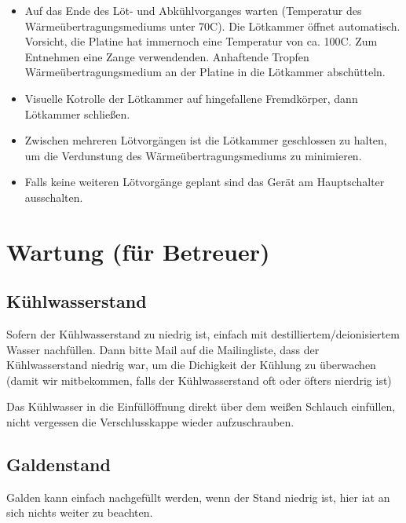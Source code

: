 \documentclass{\basedir/fablab-document}
\begin{document}
\begin{itemize}
	\item Auf das Ende des L{\"o}t- und Abk{\"u}hlvorganges warten (Temperatur des W{\"a}rme{\"u}bertragungsmediums unter 70\textdegree C). Die L{\"o}tkammer {\"o}ffnet automatisch. Vorsicht, die Platine hat immernoch eine Temperatur von ca. 100\textdegree C. Zum Entnehmen eine Zange verwendenden. Anhaftende Tropfen W{\"a}rme{\"u}bertragungsmedium an der Platine in die L{\"o}tkammer absch{\"u}tteln.
	\item Visuelle Kotrolle der L{\"o}tkammer auf hingefallene Fremdk{\"o}rper, dann L{\"o}tkammer schlie{\ss}en. 
	\item Zwischen mehreren L{\"o}tvorg{\"a}ngen ist die L{\"o}tkammer geschlossen zu halten, um die Verdunstung des W{\"a}rme{\"u}bertragungsmediums zu minimieren.
	\item Falls keine weiteren L{\"o}tvorg{\"a}nge geplant sind das Ger{\"a}t am Hauptschalter ausschalten. 
	
	\end{itemize}	
	
	\section{Wartung (f{\"u}r Betreuer)}
	
	\subsection{K{\"u}hlwasserstand}
	
	Sofern der K{\"u}hlwasserstand zu niedrig ist, einfach mit destilliertem/deionisiertem Wasser nachf{\"u}llen. Dann bitte Mail auf die Mailingliste, dass der K{\"u}hlwasserstand niedrig war, um die Dichigkeit der K{\"u}hlung zu {\"u}berwachen (damit wir mitbekommen, falls der K{\"u}hlwasserstand oft oder {\"o}fters nierdrig ist)
	
	 Das K{\"u}hlwasser in die Einf{\"u}ll{\"o}ffnung direkt {\"u}ber dem wei{\ss}en Schlauch einf{\"u}llen, nicht vergessen die Verschlusskappe wieder aufzuschrauben.
	
	\subsection{Galdenstand}	
	
	Galden kann einfach nachgef{\"u}llt werden, wenn der Stand niedrig ist, hier iat an sich nichts weiter zu beachten. 
	
	
	\newpage
\end{document}

